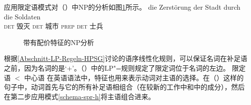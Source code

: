应用限定语模式对（）中NP的分析如图\ref{Abbildung-die-Zerstorung}所示。
\ea
\gll die          Zerstörung der          Stadt durch         die Soldaten\\
     \textsc{det} 毁灭        \textsc{det} 城市  \textsc{prep} \textsc{det} 士兵\\
\z
\begin{figure}
\centerfit{
\begin{forest}
sm edges
[N\feattab{\spr \sliste{  },\\
           \subcat \sliste{  } }
	[\ibox{1} Det
		[die;\textsc{det}]]
			[N\feattab{\spr \sliste{ \ibox{1} },\\
                   \subcat \sliste{  } }
		[N\feattab{\spr \sliste{ \ibox{1} },\\
                   \subcat \sliste{ \ibox{2} } }
			[N\feattab{\spr \sliste{ \ibox{1} },\\
                                   \subcat \sliste{ \ibox{2}, \ibox{3} } }
				[Zerstörung;毁灭]]
			[\ibox{3} NP{[\type{gen}]}
				[der Stadt; \textsc{det} 城市,roof]]]
		[\ibox{2} PP{[\type{durch}]}
			[durch die Soldaten; \textsc{prep} \textsc{det}士兵,roof]]]]
\end{forest}}
\caption{带有配价特征\sprc 的NP分析}\label{Abbildung-die-Zerstorung} 
\end{figure}%
根据\ref{Abschnitt-LP-Regeln-HPSG}讨论的语序线性化规则，可以保证名词在补足语之前，因为名词的\initialvc 是`$+$'。（）中的LP"=规则规定了限定词位于名词的左边。
\ea
限定语 $<$ 中心语
\z
%
%
在英语语法中，\sprc 特征也用来表示动词对主语的选择\citep*[\S~4.3]{SWB2003a}。在（）这样的句子中，动词首先与它的所有补足语相组合（在较新的工作中\subcatc 和\compsc 中的成分），然后在第二步应用模式\ref{schema-spr-h}将主语组合进来。
